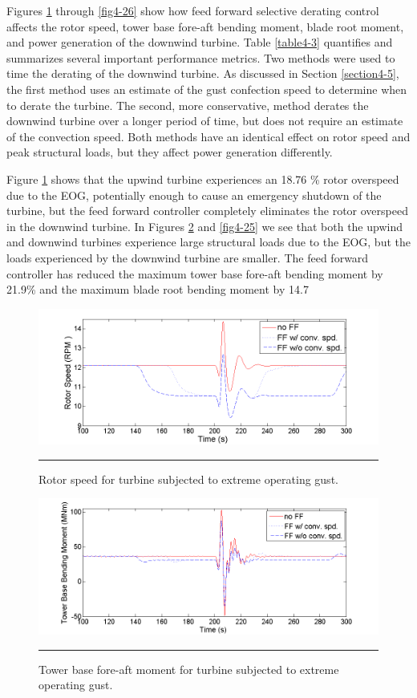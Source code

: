 Figures \ref{fig4-23} through \ref{fig4-26} show how feed forward selective derating control affects the rotor speed, tower base fore-aft bending moment, blade root moment, and power generation of the downwind turbine. Table \ref{table4-3} quantifies and summarizes several important performance metrics. Two methods were used to time the derating of the downwind turbine. As discussed in Section \ref{section4-5}, the first method uses an estimate of the gust confection speed to determine when to derate the turbine. The second, more conservative,  method derates the downwind turbine over a longer period of time, but does not require an estimate of the convection speed. Both methods have an identical effect on rotor speed and peak structural loads, but they affect power generation differently. 

Figure \ref{fig4-23} shows that the upwind turbine experiences an 18.76 \% rotor overspeed due to the EOG, potentially enough to cause an emergency shutdown of the turbine, but the feed forward controller completely eliminates the rotor overspeed in the downwind turbine. In Figures \ref{fig4-24} and \ref{fig4-25} we see that both the upwind and downwind turbines experience large structural loads due to the EOG, but the loads experienced by the downwind turbine are smaller. The feed forward controller has reduced the maximum tower base fore-aft bending moment by 21.9\% and the maximum blade root bending moment by 14.7%

\begin{figure}[htbp]
	\centering
		\includegraphics[trim = {1cm 0 2cm 0}, clip, width = \linewidth]{Figures/ch4Figures/fig4-23.png}
		\rule{35em}{0.5pt}
	\caption{Rotor speed for turbine subjected to extreme operating gust.}
	\label{fig4-23}
\end{figure}

\begin{figure}[htbp]
	\centering
		\includegraphics[trim = {1cm 0 2cm 0}, clip, width = \linewidth]{Figures/ch4Figures/fig4-24.png}
		\rule{35em}{0.5pt}
	\caption{Tower base fore-aft moment for turbine subjected to extreme operating gust.}
	\label{fig4-24}
\end{figure}

